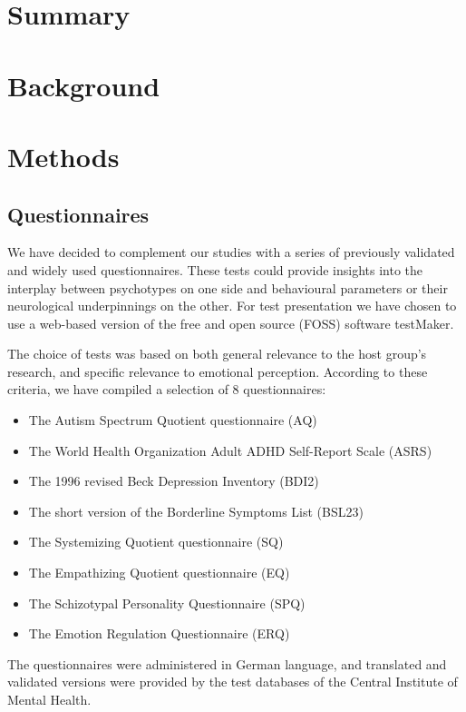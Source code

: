 
\chapter{Summary}
\readme
\chapter{Background}
\chapter{Methods}
    \section{Questionnaires}
    We have decided to complement our studies with a series of previously validated and widely used questionnaires.
    These tests could provide insights into the interplay between psychotypes on one side and behavioural parameters or their neurological underpinnings on the other.
    For test presentation we have chosen to use a web-based version of the free and open source (FOSS) software testMaker\cite{testmaker}.
    
    The choice of tests was based on both general relevance to the host group's research, and specific relevance to emotional perception.
    According to these criteria, we have compiled a selection of 8 questionnaires:
    \begin{itemize}
        \item The Autism Spectrum Quotient questionnaire (AQ) \cite{Baron-Cohen2001}
	\item The World Health Organization Adult ADHD Self-Report Scale (ASRS) \cite{Kessler2005}
	\item The 1996 revised Beck Depression Inventory (BDI2) \cite{Beck1996}
	\item The short version of the Borderline Symptoms List (BSL23) \cite{Bohus2009}
	\item The Systemizing Quotient questionnaire (SQ) \cite{Baron-Cohen2003a}
	\item The Empathizing Quotient questionnaire (EQ) \cite{Baron-Cohen2004}
	\item The Schizotypal Personality Questionnaire (SPQ) \cite{Raine1991}
	\item The Emotion Regulation Questionnaire (ERQ) \cite{Gross2003}
    \end{itemize}
    The questionnaires were administered in German language, and translated and validated versions were provided by the test databases of the Central Institute of Mental Health.   
